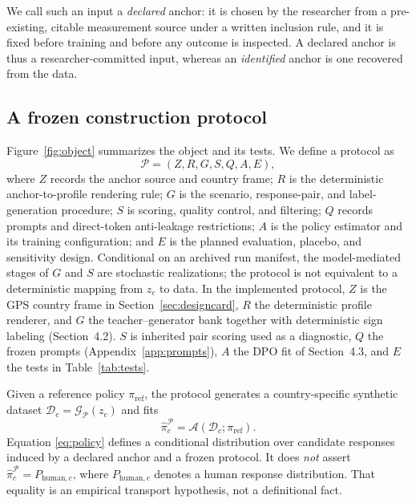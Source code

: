\documentclass[10pt,letterpaper]{article}
\newcommand{\Pcal}{\mathcal{P}}
\newcommand{\Gcal}{\mathcal{G}}
\newcommand{\Acal}{\mathcal{A}}
\newcommand{\Dcal}{\mathcal{D}}
\begin{document}
We call such an input a \emph{declared} anchor: it is chosen by the researcher from a pre-existing, citable measurement source under a written inclusion rule, and it is fixed before training and before any outcome is inspected. A declared anchor is thus a researcher-committed input, whereas an \emph{identified} anchor is one recovered from the data.

\subsection{A frozen construction protocol}\label{sec:protocol}
Figure~\ref{fig:object} summarizes the object and its tests. We define a protocol as
\begin{equation}
\Pcal=(Z,R,G,S,Q,A,E),
\label{eq:protocol}
\end{equation}
where $Z$ records the anchor source and country frame; $R$ is the deterministic anchor-to-profile rendering rule; $G$ is the scenario, response-pair, and label-generation procedure; $S$ is scoring, quality control, and filtering; $Q$ records prompts and direct-token anti-leakage restrictions; $A$ is the policy estimator and its training configuration; and $E$ is the planned evaluation, placebo, and sensitivity design. Conditional on an archived run manifest, the model-mediated stages of $G$ and $S$ are stochastic realizations; the protocol is not equivalent to a deterministic mapping from $z_c$ to data. In the implemented protocol, $Z$ is the GPS country frame in Section~\ref{sec:designcard}, $R$ the deterministic profile renderer, and $G$ the teacher--generator bank together with deterministic sign labeling (Section~4.2). $S$ is inherited pair scoring used as a diagnostic, $Q$ the frozen prompts (Appendix~\ref{app:prompts}), $A$ the DPO fit of Section~4.3, and $E$ the tests in Table~\ref{tab:tests}.

Given a reference policy $\pi_{\mathrm{ref}}$, the protocol generates a country-specific synthetic dataset $\Dcal_c=\Gcal_{\Pcal}(z_c)$ and fits
\begin{equation}
\widehat\pi_c^{\Pcal}=\Acal\!\left(\Dcal_c;\pi_{\mathrm{ref}}\right).
\label{eq:policy}
\end{equation}
Equation \eqref{eq:policy} defines a conditional distribution over candidate responses induced by a declared anchor and a frozen protocol. It does \emph{not} assert $\widehat\pi_c^{\Pcal}=P_{\mathrm{human},c}$, where $P_{\mathrm{human},c}$ denotes a human response distribution. That equality is an empirical transport hypothesis, not a definitional fact.
\end{document}

